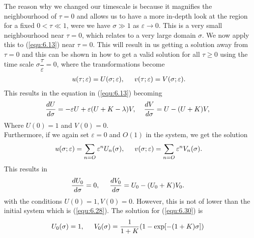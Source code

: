 \documentclass[a4paper]{report}
\theoremstyle{definition}
\begin{document}
The reason why we changed our timescale is because it magnifies the neighbourhood of $\tau=0$ and allows us to have a more in-depth look at the region for a fixed $0<\tau\ll1$, were we have $\sigma\gg1$ as $\varepsilon\rightarrow{0}$. This is a very small neighbourhood near $\tau=0$, which relates to a very large domain $\sigma$. We now apply this to (\ref{equ:6.13}) near $\tau=0$. This will result in us getting a solution away from $\tau=0$ and this can be shown in how to get a valid solution for all $\tau\geq0$ using the time scale $\sigma \dfrac{\tau}{\varepsilon} =0$, where the transformations become 
\begin{align}\label{equ:6.27}
\ u(\tau;\varepsilon)=U(\sigma;\varepsilon),\hspace{5mm}v(\tau;\varepsilon)= V(\sigma;\varepsilon).
\end{align}
This results in the equation in (\ref{equ:6.13}) becoming
\begin{align}\label{equ:6.28}
\dfrac{dU}{d\sigma}=-\varepsilon U +\varepsilon(U+K-\lambda)V,\hspace{4mm} \dfrac{dV}{d\sigma}=U-(U+K)V,
\end{align}
Where $U(0)=1$ and $V(0)=0$.\\
Furthermore, if we again set $\varepsilon=0$ and $O(1)$ in the system, we get the solution 
\begin{align}\label{equ:6.29}
\ u(\sigma;\varepsilon)= \sum_{n=O}\varepsilon{^n}U_n(\sigma),\hspace{5mm} v(\sigma;\varepsilon)= \sum_{n=O}\varepsilon{^n}V_n(\sigma).
\end{align}
This results in
\begin{align}\label{equ:6.30}
\dfrac{dU_0}{d\sigma}=0,\hspace{5mm} \dfrac{dV_0}{d\sigma}=U_0-(U_0+K)V_0.
\end{align} 
with the conditions $U(0)=1, V(0)=0$. However, this is not of lower than the initial system which is (\ref{equ:6.28}). The solution for (\ref{equ:6.30}) is
\begin{align}\label{equ:6.31}
U_0(\sigma)=1, \hspace{5mm}V_0(\sigma)=\dfrac{1}{1+K}(1-\exp[-(1+K)\sigma])
\end{align}
\end{document}

